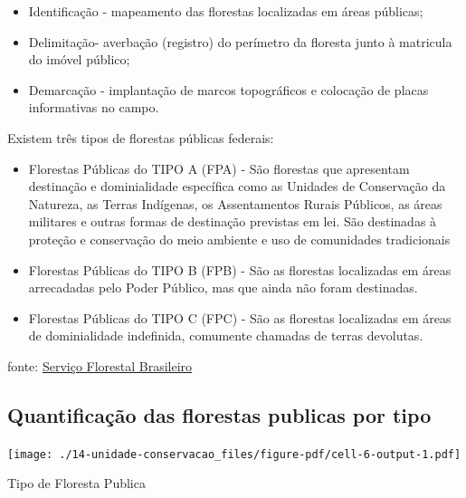 \documentclass[
  letterpaper,
]{report}
\providecommand{\tightlist}{%
  \setlength{\itemsep}{0pt}\setlength{\parskip}{0pt}}\usepackage{longtable,booktabs,array}
\begin{document}
\begin{itemize}
\tightlist
\item
  Identificação - mapeamento das florestas localizadas em áreas
  públicas;
\item
  Delimitação- averbação (registro) do perímetro da floresta junto à
  matricula do imóvel público;
\item
  Demarcação - implantação de marcos topográficos e colocação de placas
  informativas no campo.
\end{itemize}

Existem três tipos de florestas públicas federais:

\begin{itemize}
\tightlist
\item
  Florestas Públicas do TIPO A (FPA) - São florestas que apresentam
  destinação e dominialidade específica como as Unidades de Conservação
  da Natureza, as Terras Indígenas, os Assentamentos Rurais Públicos, as
  áreas militares e outras formas de destinação previstas em lei. São
  destinadas à proteção e conservação do meio ambiente e uso de
  comunidades tradicionais
\item
  Florestas Públicas do TIPO B (FPB) - São as florestas localizadas em
  áreas arrecadadas pelo Poder Público, mas que ainda não foram
  destinadas.
\item
  Florestas Públicas do TIPO C (FPC) - São as florestas localizadas em
  áreas de dominialidade indefinida, comumente chamadas de terras
  devolutas.
\end{itemize}

fonte:
\href{https://www.gov.br/agricultura/pt-br/assuntos/servico-florestal-brasileiro/cadastro-nacional-de-florestas-publicas}{Serviço
Florestal Brasileiro}

\hypertarget{quantificauxe7uxe3o-das-florestas-publicas-por-tipo}{%
\subsection{Quantificação das florestas publicas por
tipo}\label{quantificauxe7uxe3o-das-florestas-publicas-por-tipo}}

\texttt{[image: ./14-unidade-conservacao\_files/figure-pdf/cell-6-output-1.pdf]}

\n  

\n    

\n      

Tipo de Floresta Publica

\n      
\end{document}
